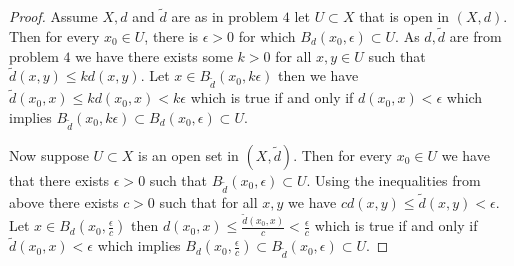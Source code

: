 \documentclass{amsart}
\theoremstyle{plain}
\theoremstyle{definition}
\theoremstyle{remark}
\begin{document}
\begin{proof}
    Assume $X,d$ and $\tilde{d}$ are as in problem $4$ let $U\subset X$ that is open in $(X,d)$. Then for every $x_0\in U$, there is $\epsilon >0$ for which $B_d(x_0,\epsilon)\subset U$. As $d,\tilde{d}$ are from problem $4$ we have there exists some $k>0$ for all $x,y\in U$ such that $\tilde{d}(x,y)\leq kd(x,y)$. Let $x\in B_{\tilde{d}}(x_0,k\epsilon)$ then we have $\tilde{d}(x_0,x)\leq kd(x_0,x)< k\epsilon$ which is true if and only if $d(x_0,x)<\epsilon$ which implies $B_{\tilde{d}}(x_0,k\epsilon)\subset B_d(x_0,\epsilon)\subset U$.

    Now suppose $U\subset X$ is an open set in $(X,\tilde{d})$. Then for every $x_0\in U$ we have that there exists $\epsilon >0$ such that $B_{\tilde{d}}(x_0,\epsilon)\subset U$. Using the inequalities from above there exists $c>0$ such that for all $x,y$ we have $cd(x,y)\leq \tilde{d}(x,y)<\epsilon$. Let $x\in B_{d}(x_0,\frac{\epsilon}{c})$ then $d(x_0,x)\leq \frac{\tilde{d}(x_0,x)}{c}<\frac{\epsilon}{c}$ which is true if and only if $\tilde{d}(x_0,x)<\epsilon$ which implies $B_d(x_0,\frac{\epsilon}{c})\subset B_{\tilde{d}}(x_0,\epsilon)\subset U$.

\end{proof}
\end{document}
